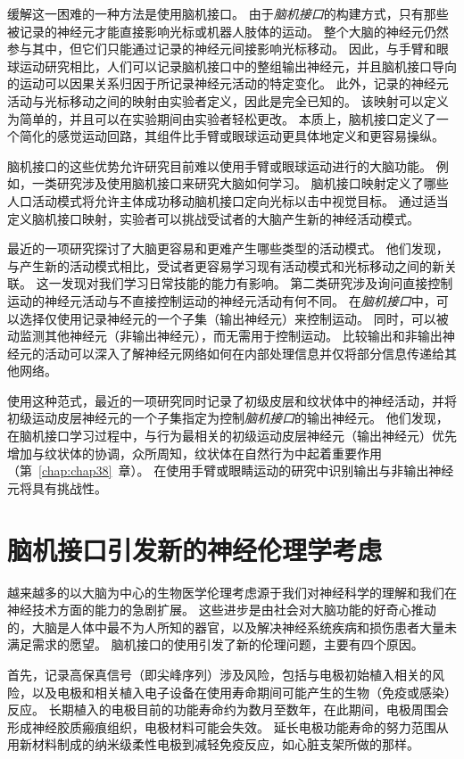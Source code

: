 缓解这一困难的一种方法是使用脑机接口。
由于\textit{脑机接口}的构建方式，只有那些被记录的神经元才能直接影响光标或机器人肢体的运动。
整个大脑的神经元仍然参与其中，但它们只能通过记录的神经元间接影响光标移动。
因此，与手臂和眼球运动研究相比，人们可以记录脑机接口中的整组输出神经元，并且脑机接口导向的运动可以因果关系归因于所记录神经元活动的特定变化。
此外，记录的神经元活动与光标移动之间的映射由实验者定义，因此是完全已知的。
该映射可以定义为简单的，并且可以在实验期间由实验者轻松更改。
本质上，脑机接口定义了一个简化的感觉运动回路，其组件比手臂或眼球运动更具体地定义和更容易操纵。


脑机接口的这些优势允许研究目前难以使用手臂或眼球运动进行的大脑功能。
例如，一类研究涉及使用脑机接口来研究大脑如何学习。 
脑机接口映射定义了哪些人口活动模式将允许主体成功移动脑机接口定向光标以击中视觉目标。
通过适当定义脑机接口映射，实验者可以挑战受试者的大脑产生新的神经活动模式。


最近的一项研究探讨了大脑更容易和更难产生哪些类型的活动模式。
他们发现，与产生新的活动模式相比，受试者更容易学习现有活动模式和光标移动之间的新关联。
这一发现对我们学习日常技能的能力有影响。
第二类研究涉及询问直接控制运动的神经元活动与不直接控制运动的神经元活动有何不同。
在\textit{脑机接口}中，可以选择仅使用记录神经元的一个子集（输出神经元）来控制运动。
同时，可以被动监测其他神经元（非输出神经元），而无需用于控制运动。
比较输出和非输出神经元的活动可以深入了解神经元网络如何在内部处理信息并仅将部分信息传递给其他网络。


使用这种范式，最近的一项研究同时记录了初级皮层和纹状体中的神经活动，并将初级运动皮层神经元的一个子集指定为控制\textit{脑机接口}的输出神经元。
他们发现，在脑机接口学习过程中，与行为最相关的初级运动皮层神经元（输出神经元）优先增加与纹状体的协调，众所周知，纹状体在自然行为中起着重要作用（第~\ref{chap:chap38}~章）。
在使用手臂或眼睛运动的研究中识别输出与非输出神经元将具有挑战性。



\section{脑机接口引发新的神经伦理学考虑}

越来越多的以大脑为中心的生物医学伦理考虑源于我们对神经科学的理解和我们在神经技术方面的能力的急剧扩展。
这些进步是由社会对大脑功能的好奇心推动的，大脑是人体中最不为人所知的器官，以及解决神经系统疾病和损伤患者大量未满足需求的愿望。
脑机接口的使用引发了新的伦理问题，主要有四个原因。


首先，记录高保真信号（即尖峰序列）涉及风险，包括与电极初始植入相关的风险，以及电极和相关植入电子设备在使用寿命期间可能产生的生物（免疫或感染）反应。
长期植入的电极目前的功能寿命约为数月至数年，在此期间，电极周围会形成神经胶质瘢痕组织，电极材料可能会失效。
延长电极功能寿命的努力范围从用新材料制成的纳米级柔性电极到减轻免疫反应，如心脏支架所做的那样。



